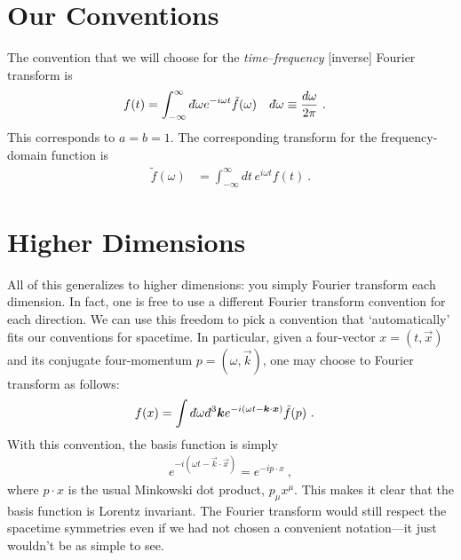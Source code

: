 \documentclass[
  11pt,
	colorful,
	raggedright,
]{tufte-style-thesis-flip}
\renewcommand{\dbar}{d\hspace*{-0.08em}\bar{}\hspace*{0.1em}}
\begin{document}
\section{Our Conventions}

The convention that we will choose for the \emph{time}--\emph{frequency} [inverse] Fourier transform is
\begin{align}
  f(t) &= \int_{-\infty}^{\infty} \dbar\omega e^{-i\omega t} \tilde f(\omega)
  &
  \dbar \omega &\equiv\frac{d\omega}{2\pi} \ .
\end{align}
This corresponds to $a=b=1$. The corresponding transform for the frequency-domain function is
\begin{align}
  \tilde f(\omega) &= 
  \int_{-\infty}^\infty d t\, e^{i\omega t} f(t) \ .
  \label{eq:inverse:fourier:convention}
\end{align}


\section{Higher Dimensions}

All of this generalizes to higher dimensions: you simply Fourier transform each dimension. In fact, one is free to use a different Fourier transform convention for each direction. We can use this freedom to pick a convention that `automatically' fits our conventions for spacetime. In particular, given a four-vector $x=(t,\vec{x})$ and its conjugate four-momentum $p=(\omega, \vec{k})$, one may choose to Fourier transform as follows: 
\begin{align}
  f(x) &= \int \dbar\omega\dbar^3\vec{k} e^{-i(\omega t-\vec{k}\cdot\vec{x})} \tilde f(p)
  \ .
\end{align}
With this convention, the basis function is simply
\begin{align}
  e^{-i(\omega t-\vec{k}\cdot\vec{x})} 
  = e^{-ip\cdot x} \ , 
\end{align}
where $p\cdot x$ is the usual Minkowski dot product, $p_\mu x^\mu$. This makes it clear that the basis function is Lorentz invariant. The Fourier transform would still respect the spacetime symmetries even if we had not chosen a convenient notation---it just wouldn't be as simple to see.
\end{document}
